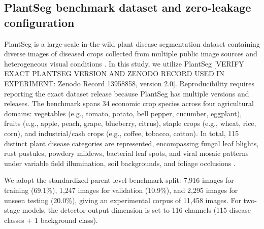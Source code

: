 \documentclass[5p,times]{elsarticle}
\begin{document}
\subsection{PlantSeg benchmark dataset and zero-leakage configuration}
PlantSeg is a large-scale in-the-wild plant disease segmentation dataset containing diverse images of diseased crops collected from multiple public image sources and heterogeneous visual conditions \cite{wei2024plantseg}. In this study, we utilize PlantSeg [VERIFY EXACT PLANTSEG VERSION AND ZENODO RECORD USED IN EXPERIMENT: Zenodo Record 13958858, version 2.0]. Reproducibility requires reporting the exact dataset release because PlantSeg has multiple versions and releases. The benchmark spans 34 economic crop species across four agricultural domains: vegetables (e.g., tomato, potato, bell pepper, cucumber, eggplant), fruits (e.g., apple, peach, grape, blueberry, citrus), staple crops (e.g., wheat, rice, corn), and industrial/cash crops (e.g., coffee, tobacco, cotton). In total, 115 distinct plant disease categories are represented, encompassing fungal leaf blights, rust pustules, powdery mildews, bacterial leaf spots, and viral mosaic patterns under variable field illumination, soil backgrounds, and foliage occlusions \cite{wei2024plantseg}.

We adopt the standardized parent-level benchmark split: 7,916 images for training (69.1\%), 1,247 images for validation (10.9\%), and 2,295 images for unseen testing (20.0\%), giving an experimental corpus of 11,458 images. For two-stage models, the detector output dimension is set to 116 channels (115 disease classes + 1 background class).
\end{document}
